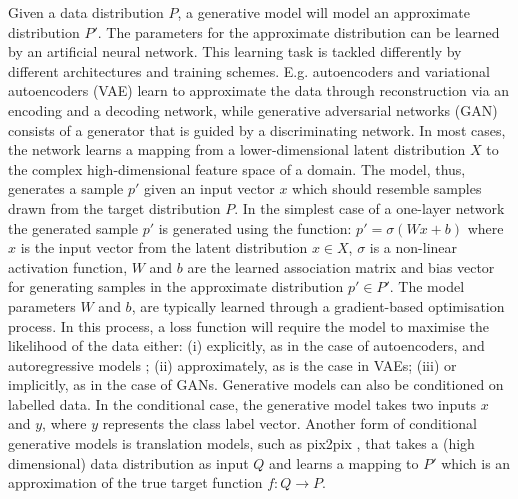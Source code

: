 Given a data distribution $P$, a generative model will model an approximate distribution $P'$. 
The parameters for the approximate distribution can be learned by an artificial neural network. 
This learning task is tackled differently by different architectures and training schemes. 
E.g. autoencoders \citep{rumelhart1985learning} and variational autoencoders (VAE) \citep{kingma2013auto,rezende2014stochastic} learn to approximate the data through reconstruction via an encoding and a decoding network, while generative adversarial networks (GAN) \citep{goodfellow2014generative} consists of a generator that is guided by a discriminating network. 
In most cases, the network learns a mapping from a lower-dimensional latent distribution $X$ to the complex high-dimensional feature space of a domain. 
The model, thus, generates a sample $p'$ given an input vector $x$ which should resemble samples drawn from the target distribution $P$. 
In the simplest case of a one-layer network the generated sample $p'$ is generated using the function: $p' = \sigma(Wx+b)$ where $x$ is the input vector from the latent distribution $x \in X$, $\sigma$ is a non-linear activation function, $W$ and $b$ are the learned association matrix and bias vector for generating samples in the approximate distribution $p' \in P'$. 
The model parameters $W$ and $b$, are typically learned through a gradient-based optimisation process. 
In this process, a loss function will require the model to maximise the likelihood of the data either: (i) explicitly, as in the case of autoencoders, and autoregressive models \citep{frey1996does}; (ii) approximately, as is the case in VAEs; (iii) or implicitly, as in the case of GANs. Generative models can also be conditioned on labelled data. In the conditional case, the generative model takes two inputs $x$ and $y$, where $y$ represents the class label vector. 
Another form of conditional generative models is translation models, such as pix2pix \citep{isola2017image}, that takes a (high dimensional) data distribution as input $Q$ and learns a mapping to $P'$ which is an approximation of the true target function $f: Q \rightarrow P$.

